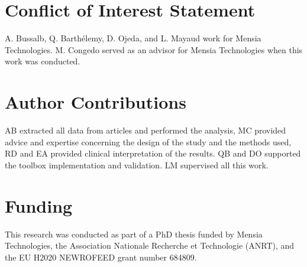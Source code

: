 
\section*{Conflict of Interest Statement}
A. Bussalb, Q. Barth\'elemy, D. Ojeda, and L. Mayaud work for Mensia Technologies.
M. Congedo served as an advisor for Mensia Technologies when this work was conducted.  

\section*{Author Contributions}
AB extracted all data from articles and performed the analysis, MC provided advice and expertise
concerning the design of the study and the methods used, RD and EA 
provided clinical interpretation of the results. QB and DO supported the toolbox implementation
and validation. LM supervised all this work. 

\section*{Funding}
This research was conducted as part of a PhD thesis funded by Mensia Technologies, the 
Association Nationale Recherche et Technologie (ANRT), and the EU H2020 NEWROFEED grant number 684809.

